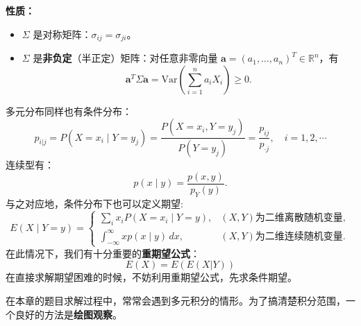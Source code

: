 \documentclass[a4paper]{ctexart}
\begin{document}
\noindent
\textbf{性质：}
\begin{itemize}
    \item $\Sigma$ 是对称矩阵：$\sigma_{ij} = \sigma_{ji}$。
    \item $\Sigma$ 是\textbf{非负定}（半正定）矩阵：对任意非零向量 $\mathbf{a} = (a_1, \ldots, a_n)^T \in \mathbb{R}^n$，有
    \[
    \mathbf{a}^T \Sigma \mathbf{a} = \mathrm{Var}\left(\sum_{i=1}^n a_i X_i\right) \ge 0.
    \]
\end{itemize}
多元分布同样也有条件分布：
\begin{equation}
    p_{i|j}=P(X=x_i \mid Y=y_j)=\frac{P(X=x_i, Y=y_j)}{P(Y=y_j)}=\frac{p_{ij}}{p_{\cdot j}}, \quad i=1,2,\cdots
\end{equation}
连续型有：
\begin{equation}
    p(x \mid y) = \frac{p(x, y)}{p_Y(y)}.
\end{equation}
与之对应地，条件分布下也可以定义期望:
\begin{equation}
    E(X \mid Y = y) = \begin{cases} 
    \sum\limits_{i} x_i P(X = x_i \mid Y = y), & (X, Y) \text{为二维离散随机变量}, \\[10pt]
    \int_{-\infty}^{\infty} x p(x \mid y) \, dx, & (X, Y) \text{为二维连续随机变量}.
    \end{cases} 
\end{equation}
在此情况下，我们有十分重要的\textbf{重期望公式}：
\begin{equation}
    E(X)=E(E(X|Y))
\end{equation}
在直接求解期望困难的时候，不妨利用重期望公式，先求条件期望。
\begin{tipbox}
在本章的题目求解过程中，常常会遇到多元积分的情形。为了搞清楚积分范围，一个良好的方法是\textbf{绘图观察}。
\end{tipbox}
\end{document}
